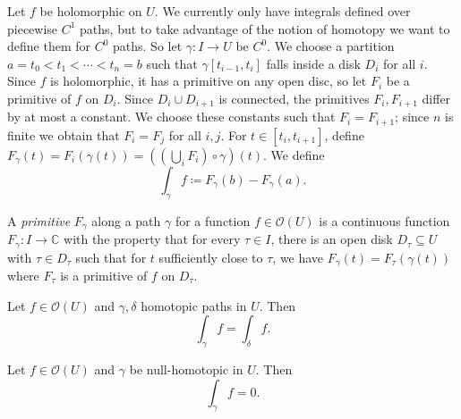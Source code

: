 
Let $f$ be holomorphic on $U$. We currently only have integrals defined over piecewise $C^1$ paths, but to take advantage of the notion of homotopy we want to define them for $C^0$ paths. So let $\gamma : I \to U$ be $C^0$. We choose a partition $a=t_0<t_1<\cdots <t_n=b$ such that $\gamma [t_{i-1} ,t_{i} ]$ falls inside a disk $D_i$ for all $i$. Since $f$ is holomorphic, it has a primitive on any open disc, so let $F_i$ be a primitive of $f$ on $D_i$. Since $D_i \cup D_{i+1} $ is connected, the primitives $F_i,F_{i+1} $ differ by at most a constant. We choose these constants such that $F_i=F_{i+1} $; since $n$ is finite we obtain that $F_i=F_j$ for all $i,j$. For $t\in[t_i,t_{i+1} ]$, define $F_\gamma (t)=F_i(\gamma (t)) = ((\bigcup_i F_i) \circ \gamma )(t)$. We define
\[
	\int_\gamma f\coloneqq F_\gamma (b)-F_\gamma (a)
.\]

\begin{definition}\label{2.0.5}
	A \emph{primitive} $F_\gamma $ along a path $\gamma $ for a function $f\in \mathcal{O}(U)$ is a continuous function $F_\gamma : I \to \mathbb{C} $ with the property that for every $\tau \in I$, there is an open disk $D_\tau \subseteq U$ with $\tau \in D_\tau $ such that for $t$ sufficiently close to $\tau $, we have $F_\gamma (t)=F_{\tau } (\gamma (t))$ where $F_{\tau } $ is a primitive of $f$ on $D_\tau $.
\end{definition}


\begin{theorem}\label{2.0.6}
	Let $f\in \mathcal{O} (U)$ and $\gamma ,\delta $ homotopic paths in $U$. Then
	\[
		\int_\gamma f=\int_\delta f
	.\]
\end{theorem}
\begin{corollary}[Cauchy]\label{2.0.7}
	Let $f\in \mathcal{O} (U)$ and $\gamma $ be null-homotopic in $U$. Then
	\[
		\int_\gamma f =0
	.\]
\end{corollary}

